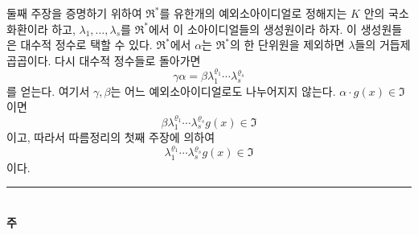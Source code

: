 둘째 주장을 증명하기 위하여 \(\mathfrak R^*\)를 유한개의 예외소아이디얼로 정해지는 \(K\) 안의 국소화환이라 하고, \(\lambda_1,\ldots,\lambda_s\)를 \(\mathfrak R^*\)에서 이 소아이디얼들의 생성원이라 하자. 이 생성원들은 대수적 정수로 택할 수 있다. \(\mathfrak R^*\)에서 \(\alpha\)는 \(\mathfrak R^*\)의 한 단위원을 제외하면 \(\lambda\)들의 거듭제곱곱이다. 다시 대수적 정수들로 돌아가면
\[
\gamma\alpha=\beta\lambda_1^{\varrho_1}\cdots\lambda_s^{\varrho_s}
\]
를 얻는다. 여기서 \(\gamma,\beta\)는 어느 예외소아이디얼로도 나누어지지 않는다. \(\alpha\cdot g(x)\in\mathfrak I\)이면
\[
\beta\lambda_1^{\varrho_1}\cdots\lambda_s^{\varrho_s}g(x)\in\mathfrak I
\]
이고, 따라서 따름정리의 첫째 주장에 의하여
\[
\lambda_1^{\varrho_1}\cdots\lambda_s^{\varrho_s}g(x)\in\mathfrak I
\]
이다.

\begin{center}
\rule{4cm}{0.4pt}\\[0.6em]
\textbf{주}
\end{center}

